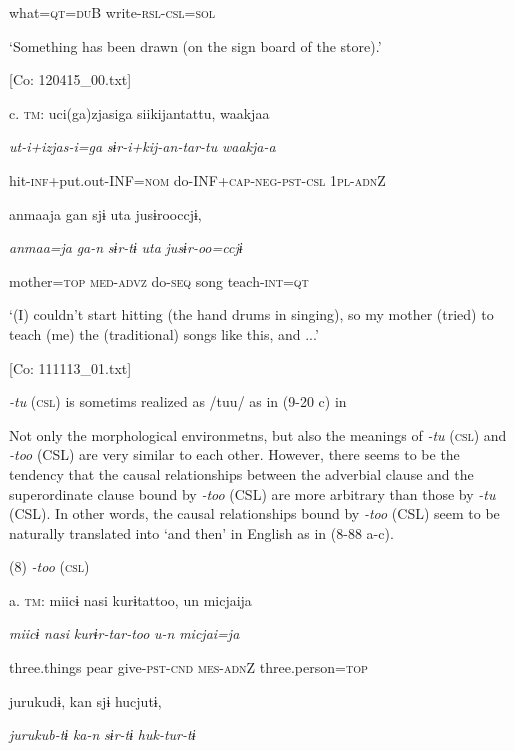       what=\textsc{qt}=\textsc{du}B  write-\textsc{rsl}-\textsc{csl}=\textsc{sol}

      ‘Something has been drawn (on the sign board of the store).’

      [Co: 120415\_00.txt]

  c.  \textsc{tm}:  uci(ga)zjasiga  siikijantattu,  waakjaa

      \textit{ut-i+izjas-i=ga}  \textit{sɨr-i+kij-an-tar-tu}  \textit{waakja-a}

      hit-\textsc{inf}+put.out-INF=\textsc{nom}  do-INF+\textsc{cap}-\textsc{neg}-\textsc{pst}-\textsc{csl}  1\textsc{pl}-\textsc{adn}Z

      anmaaja  gan  sjɨ  uta  jusɨrooccjɨ,

      \textit{anmaa=ja}  \textit{ga-n}  \textit{sɨr-tɨ}  \textit{uta}  \textit{jusɨr-oo=ccjɨ}

      mother=\textsc{top}  \textsc{med}-\textsc{advz}  do-\textsc{seq}  song  teach-\textsc{int}=\textsc{qt}

      ‘(I) couldn’t start hitting (the hand drums in singing), so my mother (tried) to teach (me) the (traditional) songs like this, and ...’

      [Co: 111113\_01.txt]

\textit{{}-tu} (\textsc{csl}) is sometims realized as /tuu/ as in (9-20 c) in 

Not only the morphological environmetns, but also the meanings of \textit{{}-tu} (\textsc{csl}) and \textit{{}-too} (CSL) are very similar to each other. However, there seems to be the tendency that the causal relationships between the adverbial clause and the superordinate clause bound by \textit{-too} (CSL) are more arbitrary than those by \textit{{}-tu} (CSL). In other words, the causal relationships bound by \textit{{}-too} (CSL) seem to be naturally translated into ‘and then’ in English as in (8-88 a-c).

(8)  \textit{{}-too} (\textsc{csl})

  a.  \textsc{tm}:  miicɨ  nasi  kurɨtattoo,  un  micjaija

      \textit{miicɨ}  \textit{nasi}  \textit{kurɨr-tar-too}  \textit{u-n}  \textit{micjai=ja}

      three.things  pear  give-\textsc{pst}-\textsc{cnd}  \textsc{mes}-\textsc{adn}Z  three.person=\textsc{top}

      jurukudɨ,  kan  sjɨ  hucjutɨ,

      \textit{jurukub-tɨ}  \textit{ka-n}  \textit{sɨr-tɨ}  \textit{huk-tur-tɨ}

